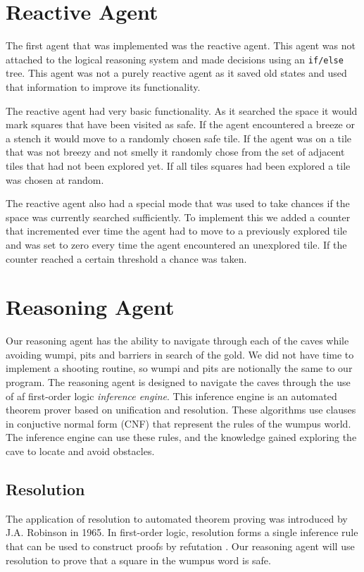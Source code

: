 \documentclass{article}
\begin{document}
\section{Reactive Agent}
The first agent that was implemented was the reactive agent.
 This agent was not attached to the logical reasoning system and made decisions using an \texttt{if/else} tree.
  This agent was not a purely reactive agent as it saved old states and used that information to improve its functionality\cite{reactive}.
  

The reactive agent had very basic functionality.
 As it searched the space it would mark squares that have been visited as safe.
  If the agent encountered a breeze or a stench it would move to a randomly chosen safe tile.
   If the agent was on a tile that was not breezy and not smelly it randomly chose from the set of adjacent tiles that had not been explored yet.
    If all tiles squares had been explored a tile was chosen at random.

The reactive agent also had a special mode that was used to take chances if the space was currently searched sufficiently.
 To implement this we added a counter that incremented ever time the agent had to move to a previously explored tile and was set to zero every time the agent encountered an unexplored tile.
  If the counter reached a certain threshold a chance was taken.

\section{Reasoning Agent}
Our reasoning agent has the ability to navigate through each of the caves while avoiding wumpi, pits and barriers in search of the gold. We did not have time to implement a shooting routine, so wumpi and pits are notionally the same to our program. The reasoning agent is designed to navigate the caves through the use of af first-order logic \textit{inference engine}. This inference engine is an automated theorem prover based on unification and resolution. These algorithms use clauses in conjuctive normal form (CNF) that represent the rules of the wumpus world. The inference engine can use these rules, and the knowledge gained exploring the cave to locate and avoid obstacles.

\subsection{Resolution}
The application of resolution to automated theorem proving was introduced by J.A. Robinson in 1965.
In first-order logic, resolution forms a single inference rule that can be used to construct proofs by refutation \cite{robinson}. 
Our reasoning agent will use resolution to prove that a square in the wumpus word is safe.
\end{document}
